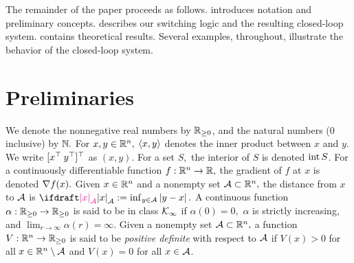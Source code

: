 The remainder of the paper proceeds as follows. 
 introduces notation and preliminary concepts.
 describes our  switching logic
and the resulting closed-loop system.
 contains theoretical results.
Several examples, throughout, illustrate
the behavior of the closed-loop system.

\section{Preliminaries}
\label{sec:preliminaries}

We denote
the nonnegative real numbers by $\mathbb{R}_{\geq0}$, 
and the natural numbers 
($0$ inclusive) by $\mathbb{N}.$ 
For $x, y \in \mathbb{R}^n,$ $\left\langle x, y \right\rangle$ denotes the 
inner product between $x$ and $y.$ 
We write $[x^{ \top} \: y^{ \top}]^{ \top}$ as $(x, y)$. 
For a set $S,$ the interior of $S$ is denoted 
$\operatorname{int} S$. %
For a continuously differentiable function $f : \mathbb{R}^{n} \to \mathbb{R},$ 
the gradient of $f$ at $x$ is denoted $\nabla f(x).$
Given $x\in \mathbb{R}^{n}$ and a nonempty set ${\mathcal{A}} \subset \mathbb{R}^{n},$ 
the distance from $x$ to ${\mathcal{A}}$ is
$\distA{x} := \inf_{y\in \calA}\abs{y - x}.$
A continuous function $\alpha : \mathbb{R}_{\geq0} \to \mathbb{R}_{\geq0}$ 
is said to be in class ${\mathcal{K}}_{\infty}$ if $\alpha(0) = 0,$
$\alpha$ is strictly increasing, and $\lim_{r \to \infty} \alpha(r) = \infty.$ 
Given a nonempty set ${\mathcal{A}} \subset \mathbb{R}^{n},$ 
a function $V : \mathbb{R}^{n} \to \mathbb{R}_{\geq0}$ is said to be 
\emph{positive definite} with respect
to ${\mathcal{A}}$ if $V(x) > 0$ for all 
$x \in \mathbb{R}^{n} \setminus {\mathcal{A}}$ 
and $V(x) = 0$ for all $x\in{\mathcal{A}}$. %


